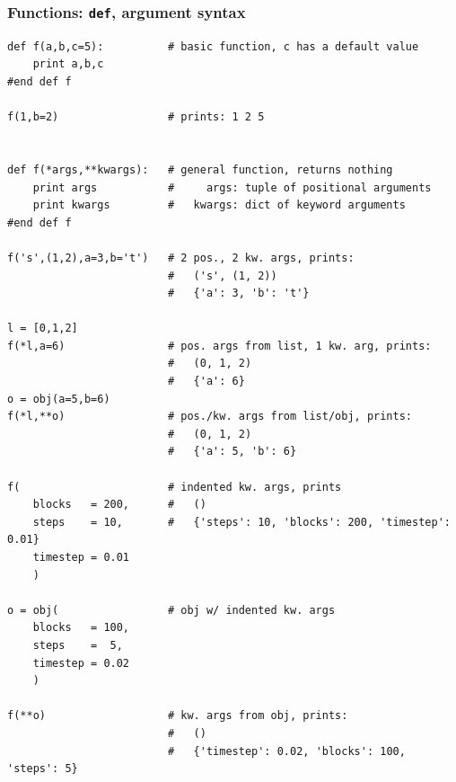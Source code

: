 \subsubsection{Functions: \texttt{def}, argument syntax}
\begin{shaded}
\begin{verbatim}
def f(a,b,c=5):          # basic function, c has a default value
    print a,b,c
#end def f

f(1,b=2)                 # prints: 1 2 5


def f(*args,**kwargs):   # general function, returns nothing
    print args           #     args: tuple of positional arguments
    print kwargs         #   kwargs: dict of keyword arguments
#end def f

f('s',(1,2),a=3,b='t')   # 2 pos., 2 kw. args, prints:
                         #   ('s', (1, 2))
                         #   {'a': 3, 'b': 't'}

l = [0,1,2]
f(*l,a=6)                # pos. args from list, 1 kw. arg, prints:
                         #   (0, 1, 2)
                         #   {'a': 6}
o = obj(a=5,b=6)
f(*l,**o)                # pos./kw. args from list/obj, prints:
                         #   (0, 1, 2)
                         #   {'a': 5, 'b': 6}

f(                       # indented kw. args, prints
    blocks   = 200,      #   () 
    steps    = 10,       #   {'steps': 10, 'blocks': 200, 'timestep': 0.01}
    timestep = 0.01
    )

o = obj(                 # obj w/ indented kw. args
    blocks   = 100,
    steps    =  5,
    timestep = 0.02
    )

f(**o)                   # kw. args from obj, prints:
                         #   ()
                         #   {'timestep': 0.02, 'blocks': 100, 'steps': 5}
\end{verbatim}
\end{shaded}
